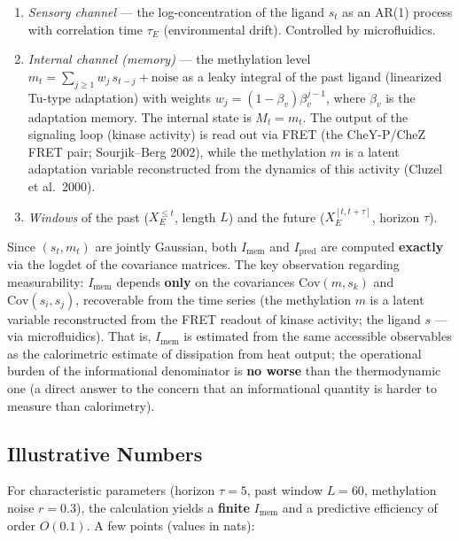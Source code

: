 \documentclass[pdflatex,sn-mathphys-ay]{sn-jnl}
\begin{document}
\begin{enumerate}
\def\labelenumi{(\alph{enumi})}
\item
  \emph{Sensory channel} --- the log-concentration of the ligand \(s_t\) as an AR(1) process with correlation time \(\tau_E\) (environmental drift). Controlled by microfluidics.
\item
  \emph{Internal channel (memory)} --- the methylation level \(m_t = \sum_{j \ge 1} w_j\, s_{t-j} + \text{noise}\) as a leaky integral of the past ligand (linearized Tu-type adaptation) with weights \(w_j = (1-\beta_v)\beta_v^{j-1}\), where \(\beta_v\) is the adaptation memory. The internal state is \(M_t = m_t\). The output of the signaling loop (kinase activity) is read out via FRET (the CheY-P/CheZ FRET pair; Sourjik--Berg 2002), while the methylation \(m\) is a latent adaptation variable reconstructed from the dynamics of this activity (Cluzel et al.~2000).
\item
  \emph{Windows} of the past (\(X_E^{\le t}\), length \(L\)) and the future (\(X_E^{[t,t+\tau]}\), horizon \(\tau\)).
\end{enumerate}

Since \((s_t, m_t)\) are jointly Gaussian, both \(I_{\text{mem}}\) and \(I_{\text{pred}}\) are computed \textbf{exactly} via the logdet of the covariance matrices. The key observation regarding measurability: \(I_{\text{mem}}\) depends \textbf{only} on the covariances \(\text{Cov}(m, s_k)\) and \(\text{Cov}(s_i, s_j)\), recoverable from the time series (the methylation \(m\) is a latent variable reconstructed from the FRET readout of kinase activity; the ligand \(s\) --- via microfluidics). That is, \(I_{\text{mem}}\) is estimated from the same accessible observables as the calorimetric estimate of dissipation from heat output; the operational burden of the informational denominator is \textbf{no worse} than the thermodynamic one (a direct answer to the concern that an informational quantity is harder to measure than calorimetry).

\subsection*{Illustrative Numbers}\label{illustrative-numbers}

For characteristic parameters (horizon \(\tau = 5\), past window \(L = 60\), methylation noise \(r = 0.3\)), the calculation yields a \textbf{finite} \(I_{\text{mem}}\) and a predictive efficiency of order \(O(0.1)\). A few points (values in nats):
\end{document}

